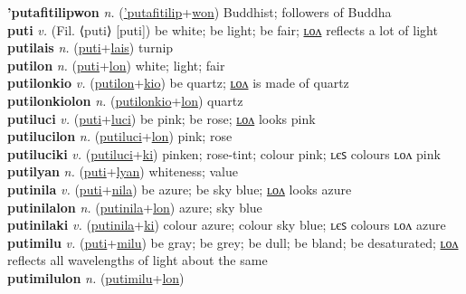 \textbf{'putafitilipwon} \textit{n.} (\hyperref['putafitilip]{'putafitilip}+\hyperref[won]{won})
Buddhist; followers of Buddha \label{'putafitilipwon} \\
\textbf{puti} \textit{v.} (Fil. ⟨puti⟩ [puti])
be white; be light; be fair; \hyperref[putilon]{ʟᴏᴧ} reflects a lot of light \label{puti} \\
\textbf{putilais} \textit{n.} (\hyperref[puti]{puti}+\hyperref[lais]{lais})
turnip \label{putilais} \\
\textbf{putilon} \textit{n.} (\hyperref[puti]{puti}+\hyperref[lon]{lon})
white; light; fair \label{putilon} \\
\textbf{putilonkio} \textit{v.} (\hyperref[putilon]{putilon}+\hyperref[kio]{kio})
be quartz; \hyperref[putilonkiolon]{ʟᴏᴧ} is made of quartz \label{putilonkio} \\
\textbf{putilonkiolon} \textit{n.} (\hyperref[putilonkio]{putilonkio}+\hyperref[lon]{lon})
quartz \label{putilonkiolon} \\
\textbf{putiluci} \textit{v.} (\hyperref[puti]{puti}+\hyperref[luci]{luci})
be pink; be rose; \hyperref[putilucilon]{ʟᴏᴧ} looks pink \label{putiluci} \\
\textbf{putilucilon} \textit{n.} (\hyperref[putiluci]{putiluci}+\hyperref[lon]{lon})
pink; rose \label{putilucilon} \\
\textbf{putiluciki} \textit{v.} (\hyperref[putiluci]{putiluci}+\hyperref[ki]{ki})
pinken; rose-tint; colour pink; ʟєꜱ colours ʟᴏᴧ pink \label{putiluciki} \\
\textbf{putilyan} \textit{n.} (\hyperref[puti]{puti}+\hyperref[lyan]{lyan})
whiteness; value \label{putilyan} \\
\textbf{putinila} \textit{v.} (\hyperref[puti]{puti}+\hyperref[nila]{nila})
be azure; be sky blue; \hyperref[putinilalon]{ʟᴏᴧ} looks azure \label{putinila} \\
\textbf{putinilalon} \textit{n.} (\hyperref[putinila]{putinila}+\hyperref[lon]{lon})
azure; sky blue \label{putinilalon} \\
\textbf{putinilaki} \textit{v.} (\hyperref[putinila]{putinila}+\hyperref[ki]{ki})
colour azure; colour sky blue; ʟєꜱ colours ʟᴏᴧ azure \label{putinilaki} \\
\textbf{putimilu} \textit{v.} (\hyperref[puti]{puti}+\hyperref[milu]{milu})
be gray; be grey; be dull; be bland; be desaturated; \hyperref[putimilulon]{ʟᴏᴧ} reflects all wavelengths of light about the same \label{putimilu} \\
\textbf{putimilulon} \textit{n.} (\hyperref[putimilu]{putimilu}+\hyperref[lon]{lon})
